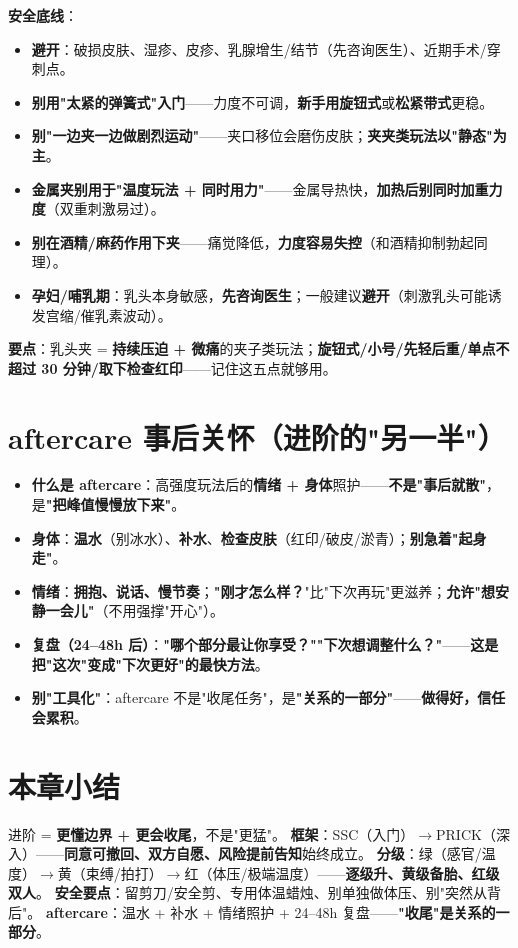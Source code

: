 \documentclass[12pt,UTF8,openany]{ctexbook}
\begin{document}
\noindent\textbf{安全底线}：
\begin{itemize}[leftmargin=2em,itemsep=0.2em]
  \item \textbf{避开}：破损皮肤、湿疹、皮疹、乳腺增生/结节（先咨询医生）、近期手术/穿刺点。
  \item \textbf{别用"太紧的弹簧式"入门}——力度不可调，\textbf{新手用旋钮式}或\textbf{松紧带式}更稳。
  \item \textbf{别"一边夹一边做剧烈运动"}——夹口移位会磨伤皮肤；\textbf{夹夹类玩法以"静态"为主}。
  \item \textbf{金属夹别用于"温度玩法 + 同时用力"}——金属导热快，\textbf{加热后别同时加重力度}（双重刺激易过）。
  \item \textbf{别在酒精/麻药作用下夹}——痛觉降低，\textbf{力度容易失控}（和酒精抑制勃起同理）。
  \item \textbf{孕妇/哺乳期}：乳头本身敏感，\textbf{先咨询医生}；一般建议\textbf{避开}（刺激乳头可能诱发宫缩/催乳素波动）。
\end{itemize}

\noindent\textbf{要点}：乳头夹 = \textbf{持续压迫 + 微痛}的夹子类玩法；\textbf{旋钮式/小号/先轻后重/单点不超过 30 分钟/取下检查红印}——记住这五点就够用。

\section{aftercare 事后关怀（进阶的"另一半"）}
\begin{itemize}[leftmargin=2em,itemsep=0.3em]
  \item \textbf{什么是 aftercare}：高强度玩法后的\textbf{情绪 + 身体}照护——\textbf{不是"事后就散"}，是\textbf{"把峰值慢慢放下来"}。
  \item \textbf{身体}：\textbf{温水}（别冰水）、\textbf{补水}、\textbf{检查皮肤}（红印/破皮/淤青）；\textbf{别急着"起身走"}。
  \item \textbf{情绪}：\textbf{拥抱、说话、慢节奏}；\textbf{"刚才怎么样？}"比"下次再玩"更滋养；\textbf{允许"想安静一会儿"}（不用强撑"开心"）。
  \item \textbf{复盘（24--48h 后）}：\textbf{"哪个部分最让你享受？""下次想调整什么？"}——\textbf{这是把"这次"变成"下次更好"的最快方法}。
  \item \textbf{别"工具化"}：aftercare 不是"收尾任务"，是\textbf{"关系的一部分"}——\textbf{做得好，信任会累积}。
\end{itemize}

\section{本章小结}
进阶 = \textbf{更懂边界 + 更会收尾}，不是"更猛"。
\textbf{框架}：SSC（入门）$\to$PRICK（深入）——\textbf{同意可撤回、双方自愿、风险提前告知}始终成立。
\textbf{分级}：绿（感官/温度）$\to$黄（束缚/拍打）$\to$红（体压/极端温度）——\textbf{逐级升、黄级备胎、红级双人}。
\textbf{安全要点}：留剪刀/安全剪、专用体温蜡烛、别单独做体压、别"突然从背后"。
\textbf{aftercare}：温水 + 补水 + 情绪照护 + 24--48h 复盘——\textbf{"收尾"是关系的一部分}。
\end{document}
